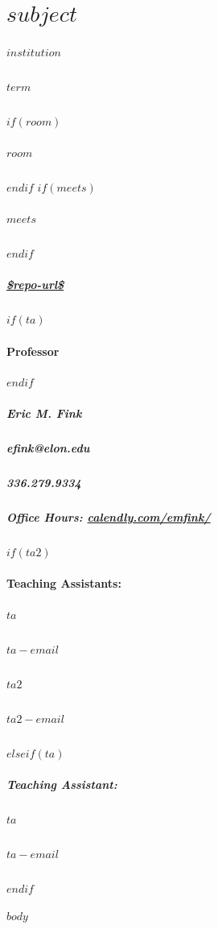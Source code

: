 \documentclass[11pt,letterpaper,twoside]{article}
\begin{document}
\thispagestyle{empty}


\color{OffBlack}

\section{$subject$}

\begin{footnotesize}
\subparagraph{$institution$}
\subparagraph{$term$}
$if(room)$\subparagraph{$room$}$endif$
$if(meets)$\subparagraph{$meets$}$endif$
\subparagraph{\url{$repo-url$}}
\vspace{1em}

$if(ta)$\paragraph{Professor}$endif$
\subparagraph{Eric M. Fink} 
\subparagraph{efink@elon.edu}
\subparagraph{336.279.9334} 
\subparagraph{Office Hours: {\url{calendly.com/emfink/}}}

\vspace{1em}

$if(ta2)$
\paragraph{Teaching Assistants:}
\subparagraph{$ta$}
\subparagraph{$ta-email$}
\vspace{.5em}
\subparagraph{$ta2$}
\subparagraph{$ta2-email$}
$elseif(ta)$
\subparagraph{Teaching Assistant:}
\subparagraph{$ta$}
\subparagraph{$ta-email$}
$endif$
\end{footnotesize}

\vspace{1em}


$body$
\end{document}
